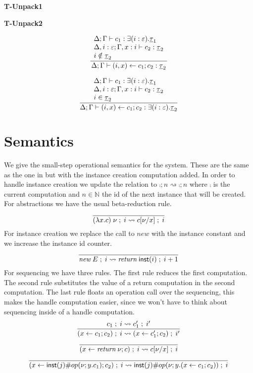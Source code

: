 \begin{minipage}{0.5\textwidth}
\textbf{T-Unpack1}
\end{minipage}
\begin{minipage}{0.5\textwidth}
\textbf{T-Unpack2}
\end{minipage}
\begin{minipage}{0.5\textwidth}
\[\frac{
	\begin{array}{l}
	\Delta;\Gamma \vdash c_1 : \exists(i:\varepsilon) . \underline{\tau}_1 \\
	\Delta,i:\varepsilon;\Gamma,x:i \vdash c_2 : \underline{\tau}_2 \\
	i \notin \underline{\tau}_2
	\end{array}
}{
	\Delta;\Gamma \vdash (i, x) \leftarrow c_1 ; c_2 : \underline{\tau}_2
}\]
\end{minipage}
\begin{minipage}{0.5\textwidth}
\[\frac{
	\begin{array}{l}
	\Delta;\Gamma \vdash c_1 : \exists(i:\varepsilon) . \underline{\tau}_1 \\
	\Delta,i:\varepsilon;\Gamma,x:i \vdash c_2 : \underline{\tau}_2 \\
	i \in \underline{\tau}_2
	\end{array}
}{
	\Delta;\Gamma \vdash (i, x) \leftarrow c_1 ; c_2 : \exists(i:\varepsilon) . \underline{\tau}_2
}\]
\end{minipage}

\section{Semantics}
We give the small-step operational semantics for the system. These are the same as the one in \cite{effectsystem} but with the instance creation computation added. In order to handle instance creation we update the relation to $\comp; n \rightsquigarrow \comp;n$ where $\comp$ is the current computation and $n \in \mathbb{N}$ the id of the next instance that will be created. \\
For abstractions we have the usual beta-reduction rule.\\
\[\frac{
}{
	(\lambda x . c) \; \nu\;;\; i \rightsquigarrow c[\nu/x]\;;\; i
}\]
For instance creation we replace the call to $new$ with the instance constant and we increase the instance id counter.\\
\[\frac{
}{
	\textit{new} \; E\;;\; i \rightsquigarrow \textit{return} \; \mathsf{inst}(i)\;;\; i + 1
}\]
For sequencing we have three rules. The first rule reduces the first computation.
The second rule substitutes the value of a return computation in the second computation.
The last rule floats an operation call over the sequencing, this makes the handle computation easier, since we won't have to think about sequencing inside of a handle computation.\\
\[\frac{
	c_1\;;\; i \rightsquigarrow c'_1\;;\; i'
}{
	(x \leftarrow c_1 ; c_2)\;;\; i \rightsquigarrow (x \leftarrow c'_1 ; c_2)\;;\; i'
}\]
\[\frac{
}{
	(x \leftarrow \textit{return} \; \nu ; c)\;;\; i \rightsquigarrow c[\nu/x]\;;\; i
}\]
\[\frac{
}{
	(x \leftarrow \mathsf{inst}(j) \# op(\nu ; y . c_1) ; c_2)\;;\; i \rightsquigarrow \mathsf{inst}(j) \# op(\nu ; y . (x \leftarrow c_1 ; c_2))\;;\; i
}\]

